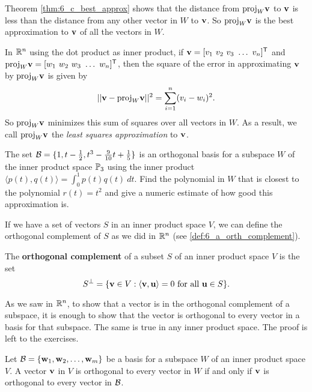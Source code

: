 Theorem \ref{thm:6_c_best_approx} shows that the distance from $\text{proj}_W \mathbf{v}$ to $\mathbf{v}$ is less than the distance from any other vector in $W$ to $\mathbf{v}$. So $\text{proj}_W \mathbf{v}$ is the best approximation to $\mathbf{v}$ of all the vectors in $W$.

In $\mathbb{R}^n$ using the dot product as inner product, if $\vv = [v_1 \ v_2 \ v_3 \ \ldots \ v_n]^{\tr}$ and $\text{proj}_W \mathbf{v} =  [w_1 \ w_2 \ w_3 \ \ldots \ w_n]^{\mathsf{T}}$, then the square of the error in approximating $\mathbf{v}$ by $\text{proj}_W \mathbf{v}$ is given by
\[|| \mathbf{v} - \text{proj}_W \mathbf{v} ||^2 = \sum_{i=1}^n (v_i - w_i)^2.\]
So $\text{proj}_W \mathbf{v}$ minimizes this sum of squares over all vectors in $W$. As a result, we call $\text{proj}_W \mathbf{v}$ the \emph{least squares approximation} to $\mathbf{v}$.


\begin{activity} The set $\mathcal{B} = \{1, t-\frac{1}{2}, t^3-\frac{9}{10}t+\frac{1}{5}\}$ is an orthogonal basis for a subspace $W$ of the inner product space $\mathbb{P}_3$ using the inner product $\langle p(t), q(t) \rangle = \int_0^1 p(t)q(t) \ dt$. Find the polynomial in $W$ that is closest to the polynomial $r(t) = t^2$ and give a numeric estimate of how good this approximation is.


\end{activity}



If we have a set of vectors $S$ in an inner product space $V$, we can define the orthogonal complement of $S$ as we did in $\mathbb{R}^n$ (see \ref{def:6_a_orth_complement}).

\begin{definition} The \textbf{orthogonal complement} of a subset $S$ of an inner product space $V$ is the set
\[S^{\perp} = \{\mathbf{v} \in V : \langle \mathbf{v}, \mathbf{u} \rangle = 0 \text{ for all } \mathbf{u} \in S\}.\]
\end{definition}

As we saw in $\mathbb{R}^n$, to show that a vector is in the orthogonal complement of a subspace, it is enough to show that the vector is orthogonal to every vector in a basis for that subspace. The same is true in any inner product space. The proof is left to the exercises. 

\begin{theorem} \label{thm:6_e_ip_orth_complement_basis} Let $\mathcal{B} = \{\mathbf{w}_1, \mathbf{w}_2, \ldots, \mathbf{w}_m\}$ be a basis for a subspace $W$ of an inner product space $V$. A vector $\mathbf{v}$ in $V$ is orthogonal to every vector in $W$ if and only if $\mathbf{v}$ is orthogonal to every vector in $\mathcal{B}$.
\end{theorem}


